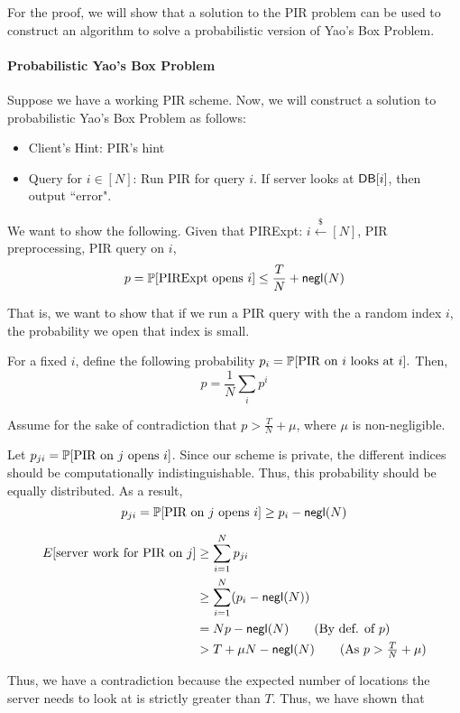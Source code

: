 For the proof, we will show that a solution to the PIR problem can be used to construct an algorithm to solve a probabilistic version of Yao's Box Problem.

\paragraph{Probabilistic Yao's Box Problem}
Suppose we have a working PIR scheme. Now, we will construct a solution to probabilistic Yao's Box Problem as follows:

\begin{itemize}
    \item Client's Hint: PIR's hint
    \item Query for $i \in [N]$: Run PIR for query $i$. If server looks at ${\sf DB}[i]$, then output ``error".
\end{itemize}

We want to show the following. Given that PIRExpt: $i \xleftarrow{\$} [N]$, PIR preprocessing, PIR query on $i$,
\[p =\mathbb{P}[\text{PIRExpt opens $i$}] \le \frac{T}{N} + {\sf negl}(N)\]

That is, we want to show that if we run a PIR query with the a random index $i$, the probability we open that index is small.

For a fixed $i$, define the following probability $p_i = \mathbb{P}[\text{PIR on $i$ looks at $i$}].$ Then, 
\[p =\frac{1}{N} \sum_i p^i\]

Assume for the sake of contradiction that  $p > \frac{T}{N} + \mu$, where $\mu$ is non-negligible.

Let $p_{ji} = \mathbb{P}[\text{PIR on $j$ opens $i$}]$. Since our scheme is private, the different indices should be computationally indistinguishable. Thus, this probability should be equally distributed. As a result,
\[p_{ji} = \mathbb{P}[\text{PIR on $j$ opens $i$}] \ge p_i - {\sf negl}(N)\]

\begin{align*}
    E[\text{server work for PIR on $j$}] &\ge \sum_{i=1}^N p_{ji} \\
    &\ge \sum_{i=1}^N (p_{i} - \negl(N))\\
    &= Np - \negl(N) \tag{By def. of $p$}\\
    &> T + \mu N - \negl(N) \tag{As $p > \frac{T}{N} + \mu$}\\ 
\end{align*}

Thus, we have a contradiction because the expected number of locations the server needs to look at is strictly greater than $T$. Thus, we have shown that 


